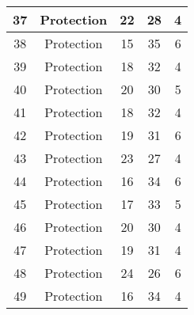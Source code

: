 \documentclass[results.tex]{subfiles}
\begin{document}
\begin{center}
\begin{tabular}{| c || c | c | c | c |}
            \hline
            37                      & Protection                   & 22                     & 28                      & 4                    \\
            \hline
            38                      & Protection                   & 15                     & 35                      & 6                    \\
            \hline
            39                      & Protection                   & 18                     & 32                      & 4                    \\
            \hline
            40                      & Protection                   & 20                     & 30                      & 5                    \\
            \hline
            41                      & Protection                   & 18                     & 32                      & 4                    \\
            \hline
            42                      & Protection                   & 19                     & 31                      & 6                    \\
            \hline
            43                      & Protection                   & 23                     & 27                      & 4                    \\
            \hline
            44                      & Protection                   & 16                     & 34                      & 6                    \\
            \hline
            45                      & Protection                   & 17                     & 33                      & 5                    \\
            \hline
            46                      & Protection                   & 20                     & 30                      & 4                    \\
            \hline
            47                      & Protection                   & 19                     & 31                      & 4                    \\
            \hline
            48                      & Protection                   & 24                     & 26                      & 6                    \\
            \hline
            49                      & Protection                   & 16                     & 34                      & 4                    \\
            \hline
        \end{tabular}
    \end{center}
\end{document}

